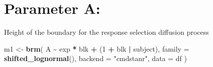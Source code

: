 \documentclass[
]{article}
\newenvironment{Shaded}{\begin{snugshade}}{\end{snugshade}}
\newcommand{\AttributeTok}[1]{\textcolor[rgb]{0.13,0.29,0.53}{#1}}
\newcommand{\DecValTok}[1]{\textcolor[rgb]{0.00,0.00,0.81}{#1}}
\newcommand{\FunctionTok}[1]{\textcolor[rgb]{0.13,0.29,0.53}{\textbf{#1}}}
\newcommand{\NormalTok}[1]{#1}
\newcommand{\OtherTok}[1]{\textcolor[rgb]{0.56,0.35,0.01}{#1}}
\newcommand{\SpecialCharTok}[1]{\textcolor[rgb]{0.81,0.36,0.00}{\textbf{#1}}}
\newcommand{\StringTok}[1]{\textcolor[rgb]{0.31,0.60,0.02}{#1}}
\begin{document}
\begin{Shaded}
\end{Shaded}

\hypertarget{parameter-a}{%
\section{Parameter A:}\label{parameter-a}}

Height of the boundary for the response selection diffusion process

\begin{Shaded}
\begin{Highlighting}[]
\NormalTok{m1 }\OtherTok{\textless{}{-}} \FunctionTok{brm}\NormalTok{(}
\NormalTok{  A }\SpecialCharTok{\textasciitilde{}}\NormalTok{ exp }\SpecialCharTok{*}\NormalTok{ blk }\SpecialCharTok{+}\NormalTok{ (}\DecValTok{1} \SpecialCharTok{+}\NormalTok{ blk }\SpecialCharTok{|}\NormalTok{ subject),}
  \AttributeTok{family =} \FunctionTok{shifted\_lognormal}\NormalTok{(),}
  \AttributeTok{backend =} \StringTok{"cmdstanr"}\NormalTok{,}
  \AttributeTok{data =}\NormalTok{ df}
\NormalTok{)}
\end{Highlighting}
\end{Shaded}
\end{document}
